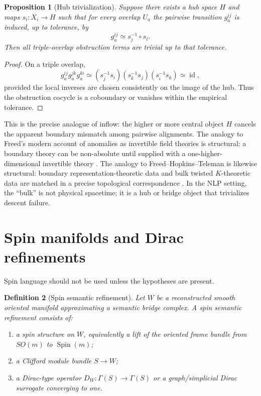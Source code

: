 \documentclass[11pt]{article}
\newtheorem{definition}{Definition}[section]
\newtheorem{proposition}[definition]{Proposition}
\begin{document}
\begin{proposition}[Hub trivialization]
Suppose there exists a hub space $H$ and maps $s_i:X_i\to H$ such that for every overlap $U_a$ the pairwise transition $g^{ij}_a$ is induced, up to tolerance, by
\[
  g^{ij}_a\simeq s_j^{-1}\circ s_i.
\]
Then all triple-overlap obstruction terms are trivial up to that tolerance.
\end{proposition}

\begin{proof}
On a triple overlap,
\[
  g^{ij}_a g^{jk}_a g^{ki}_a
  \simeq (s_j^{-1}s_i)(s_k^{-1}s_j)(s_i^{-1}s_k)
  \simeq \operatorname{id},
\]
provided the local inverses are chosen consistently on the image of the hub.  Thus the obstruction cocycle is a coboundary or vanishes within the empirical tolerance.
\end{proof}

This is the precise analogue of inflow: the higher or more central object $H$ cancels the apparent boundary mismatch among pairwise alignments.  The analogy to Freed's modern account of anomalies as invertible field theories is structural: a boundary theory can be non-absolute until supplied with a one-higher-dimensional invertible theory \cite{FreedAnomalies2014}.  The analogy to Freed--Hopkins--Teleman is likewise structural: boundary representation-theoretic data and bulk twisted $K$-theoretic data are matched in a precise topological correspondence \cite{FreedFHT2002,FreedHopkinsTelemanII}.  In the NLP setting, the ``bulk'' is not physical spacetime; it is a hub or bridge object that trivializes descent failure.

\section{Spin manifolds and Dirac refinements}

Spin language should not be used unless the hypotheses are present.

\begin{definition}[Spin semantic refinement]
Let $W$ be a reconstructed smooth oriented manifold approximating a semantic bridge complex.  A spin semantic refinement consists of:
\begin{enumerate}[label=(\roman*)]
  \item a spin structure on $W$, equivalently a lift of the oriented frame bundle from $SO(m)$ to $\operatorname{Spin}(m)$;
  \item a Clifford module bundle $S\to W$;
  \item a Dirac-type operator $D_W:\Gamma(S)\to\Gamma(S)$ or a graph/simplicial Dirac surrogate converging to one.
\end{enumerate}
\end{definition}
\end{document}
